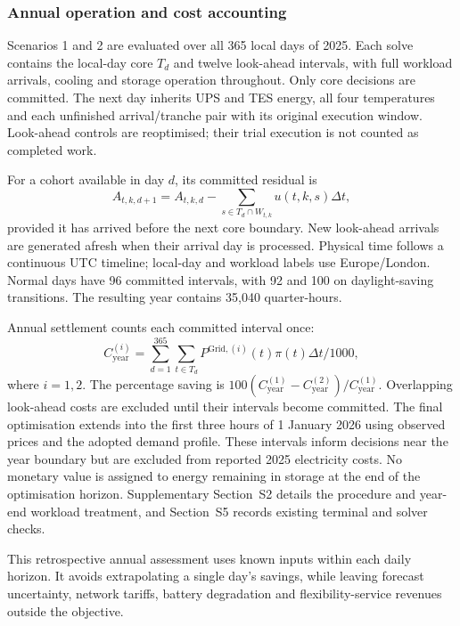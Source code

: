 \documentclass[lettersize,journal]{IEEEtran}
\begin{document}
\subsubsection{Annual operation and cost accounting}\label{sec:annual-operation}
Scenarios 1 and 2 are evaluated over all 365 local days of 2025. Each solve contains the local-day core $T_d$ and twelve look-ahead intervals, with full workload arrivals, cooling and storage operation throughout. Only core decisions are committed. The next day inherits UPS and TES energy, all four temperatures and each unfinished arrival/tranche pair with its original execution window. Look-ahead controls are reoptimised; their trial execution is not counted as completed work.

For a cohort available in day $d$, its committed residual is
\begin{equation}
A_{t,k,d+1}=A_{t,k,d}-\sum_{s\in T_d\cap W_{t,k}}u(t,k,s)\Delta t,
\label{eq:cohort-handoff}
\end{equation}
provided it has arrived before the next core boundary. New look-ahead arrivals are generated afresh when their arrival day is processed. Physical time follows a continuous UTC timeline; local-day and workload labels use Europe/London. Normal days have 96 committed intervals, with 92 and 100 on daylight-saving transitions. The resulting year contains 35,040 quarter-hours.

Annual settlement counts each committed interval once:
\begin{equation}
C^{(i)}_{\mathrm{year}}=\sum_{d=1}^{365}\sum_{t\in T_d}P^{\mathrm{Grid},(i)}(t)\pi(t)\Delta t/1000,
\label{eq:annual-cost}
\end{equation}
where $i=1,2$. The percentage saving is $100(C^{(1)}_{\mathrm{year}}-C^{(2)}_{\mathrm{year}})/C^{(1)}_{\mathrm{year}}$. Overlapping look-ahead costs are excluded until their intervals become committed. The final optimisation extends into the first three hours of 1 January 2026 using observed prices and the adopted demand profile. These intervals inform decisions near the year boundary but are excluded from reported 2025 electricity costs. No monetary value is assigned to energy remaining in storage at the end of the optimisation horizon. Supplementary Section~S2 details the procedure and year-end workload treatment, and Section~S5 records existing terminal and solver checks.

This retrospective annual assessment uses known inputs within each daily horizon. It avoids extrapolating a single day's savings, while leaving forecast uncertainty, network tariffs, battery degradation and flexibility-service revenues outside the objective.
\end{document}
